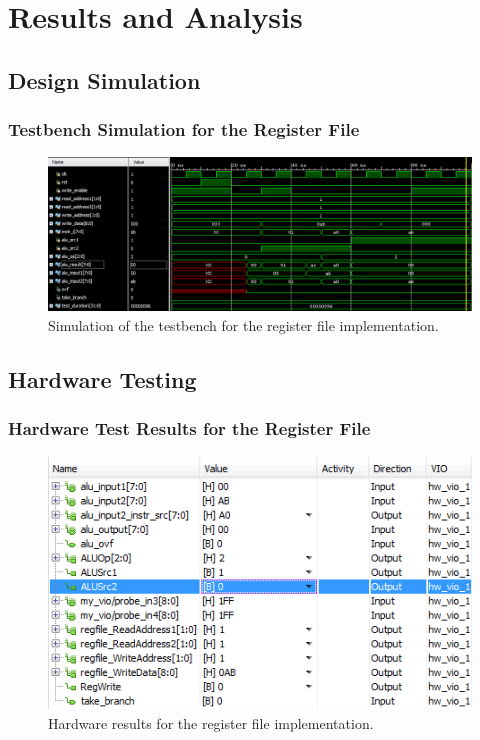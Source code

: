 \documentclass[12pt, letterpaper]{article}
\begin{document}
\newpage
\section{Results and Analysis}

\subsection{Design Simulation}

\subsubsection{Testbench Simulation for the Register File}
\begin{figure}[h]
\includegraphics[width=\linewidth]{images/lab4-results-1.png}
\caption{Simulation of the testbench for the register file implementation.}
\end{figure}


\subsection{Hardware Testing}

\FloatBarrier
\subsubsection{Hardware Test Results for the Register File}
\begin{figure}[h]
\includegraphics[width=\linewidth]{images/lab4-results-2.png}
\caption{Hardware results for the register file implementation.}
\end{figure}
\end{document}
